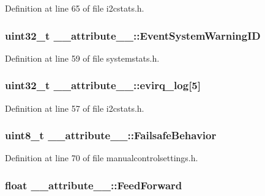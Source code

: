\-Definition at line 65 of file i2cstats.\-h.

\hypertarget{struct____attribute_____adf57e72eaa80dbac29033af2ffd06a8a}{
\subsubsection[{\-Event\-System\-Warning\-I\-D}]{\setlength{\rightskip}{0pt plus 5cm}uint32\-\_\-t {\bf \-\_\-\-\_\-attribute\-\_\-\-\_\-\-::\-Event\-System\-Warning\-I\-D}}}\label{struct____attribute_____adf57e72eaa80dbac29033af2ffd06a8a}


\-Definition at line 59 of file systemstats.\-h.

\hypertarget{struct____attribute_____a9d30c7564162ad5f30ac0dd4678a3050}{
\subsubsection[{evirq\-\_\-log}]{\setlength{\rightskip}{0pt plus 5cm}uint32\-\_\-t {\bf \-\_\-\-\_\-attribute\-\_\-\-\_\-\-::evirq\-\_\-log}\mbox{[}5\mbox{]}}}\label{struct____attribute_____a9d30c7564162ad5f30ac0dd4678a3050}


\-Definition at line 57 of file i2cstats.\-h.

\hypertarget{struct____attribute_____a12df0702c4655870a1c4edaeb4b46731}{
\subsubsection[{\-Failsafe\-Behavior}]{\setlength{\rightskip}{0pt plus 5cm}uint8\-\_\-t {\bf \-\_\-\-\_\-attribute\-\_\-\-\_\-\-::\-Failsafe\-Behavior}}}\label{struct____attribute_____a12df0702c4655870a1c4edaeb4b46731}


\-Definition at line 70 of file manualcontrolsettings.\-h.

\hypertarget{struct____attribute_____a7d242f0509d2eb2865606d6c9d49e10d}{
\subsubsection[{\-Feed\-Forward}]{\setlength{\rightskip}{0pt plus 5cm}float {\bf \-\_\-\-\_\-attribute\-\_\-\-\_\-\-::\-Feed\-Forward}}}\label{struct____attribute_____a7d242f0509d2eb2865606d6c9d49e10d}


